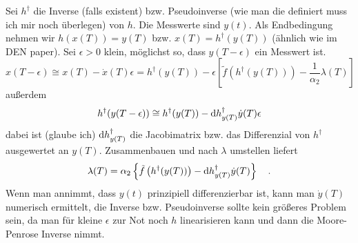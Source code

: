 Sei $h^\dagger$ die Inverse (falls existent) bzw. Pseudoinverse (wie man die definiert muss ich mir noch überlegen) von $h$. Die Messwerte sind $y(t)$. Als Endbedingung nehmen wir $h(x(T)) = y(T)$ bzw. $x(T)=h^\dagger(y(T))$ (ähnlich wie im DEN paper). Sei $
\epsilon>0$ klein, möglichst so, dass $y(T-\epsilon)$ ein Messwert ist.
\begin{equation}
x(T-\epsilon) \cong x(T) - \dot{x}(T) \epsilon = h^\dagger(y(T))-\epsilon 
\left[ \tilde{f}(h^\dagger(y(T)))-\frac{1}{\alpha_2} \lambda(T) \right]
\end{equation}
außerdem
\begin{equation}
h^\dagger( y(T-\epsilon) ) \cong h^\dagger (y(T)) - \text{d} h^\dagger_{y(T)} \dot{y}(T)
\epsilon
\end{equation}
dabei ist (glaube ich) $\text{d} h^\dagger_{y(T)}$ die Jacobimatrix bzw. das Differenzial von 
$h^\dagger$ ausgewertet an $y(T)$.
Zusammenbauen und nach $\lambda$ umstellen liefert
\begin{equation}
\lambda(T) = \alpha_2 \left\{
\tilde{f}\left(h^\dagger(y(T)) \right) - \text{d} h^\dagger_{y(T)} \dot{y}(T)
 \right\} \quad .
\end{equation}
Wenn man annimmt, dass $y(t)$ prinzipiell differenzierbar ist, kann man $\dot{y}(T)$ 
numerisch ermittelt, die Inverse bzw. Pseudoinverse sollte kein größeres Problem sein, 
da man für kleine $\epsilon$ zur Not noch $h$ linearisieren kann und dann die 
Moore-Penrose Inverse nimmt.




